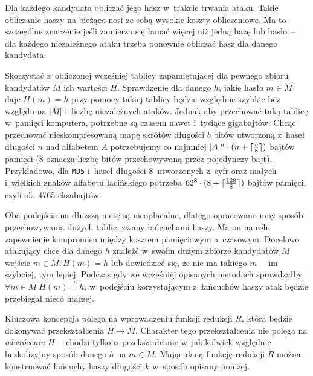 \begin{myenumerate}

    \item Dla każdego kandydata obliczać jego hasz w~trakcie trwania ataku.
    Takie obliczanie haszy na bieżąco nosi ze sobą wysokie koszty obliczeniowe.
    Ma to szczególne znaczenie jeśli zamierza się łamać więcej niż jedną bazę
    lub hasło~-- dla każdego niezależnego ataku trzeba ponownie obliczać hasz
    dla danego kandydata.

    \item Skorzystać z~obliczonej wcześniej tablicy zapamiętującej dla pewnego
    zbioru kandydatów $M$ ich wartości $H$. Sprawdzenie dla danego $h$, jakie
    hasło $m \in M$ daje $H(m) = h$ przy pomocy takiej tablicy będzie względnie
    szybkie bez względu na $|M|$ i~liczbę niezależnych ataków. Jednak aby
    przechować taką tablicę w~pamięci komputera, potrzebne są czasem nawet
    i~tysiące gigabajtów. Chcąc przechować nieskompresowaną mapę skrótów
    długości $b$ bitów utworzoną z~haseł długości $n$ nad alfabetem $A$
    potrzebujemy co najmniej $|A|^n \cdot (n + \lceil\frac{b}{8}\rceil)$ bajtów
    pamięci (8 oznacza liczbę bitów przechowywaną przez pojedynczy bajt).
    Przykładowo, dla \texttt{MD5} i~haseł długości 8~utworzonych z~cyfr oraz
    małych i~wielkich znaków alfabetu łacińskiego potrzeba $62^8 \cdot (8 +
    \lceil\frac{128}{8}\rceil)$ bajtów pamięci, czyli ok. 4765 eksabajtów.

\end{myenumerate}

Oba podejścia na dłuższą metę są nieopłacalne, dlatego opracowano inny sposób
przechowywania dużych tablic, zwany łańcuchami haszy. Ma on na celu zapewnienie
kompromisu między kosztem pamięciowym a~czasowym. Docelowo atakujący chce dla
danego $h$ znaleźć w~swoim dużym zbiorze kandydatów $M$ wejście $m \in M : H(m)
= h$ lub dowiedzieć się, że nie ma takiego $m$~-- im szybciej, tym lepiej.
Podczas gdy we wcześniej opisanych metodach sprawdzałby $\forall m \in M \;
H(m) \stackrel{?}{=} h$, w~podejściu korzystającym z~łańcuchów haszy atak
będzie przebiegał nieco inaczej.

Kluczowa koncepcja polega na wprowadzeniu funkcji redukcji $R$, która będzie
dokonywać przekształcenia $H \to M$. Charakter tego przekształcenia nie polega
na \emph{odwróceniu} $H$~-- chodzi tylko o~przekształcanie w~jakikolwiek
względnie bezkolizyjny sposób danego $h$ na $m \in M$. Mając daną funkcję
redukcji $R$ można konstruować łańcuchy haszy długości $k$ w~sposób opisany
poniżej.


